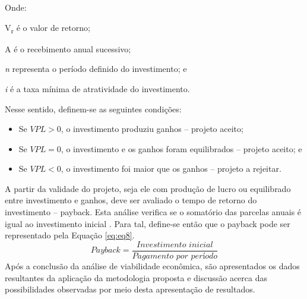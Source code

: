 \noindent Onde:\par
\setlength\parindent{1.5cm} V\textsubscript{r} é o valor de retorno;\par
\setlength\parindent{1.5cm} A é o recebimento anual sucessivo;\par
\setlength\parindent{1.5cm} \textit{n} representa o período definido do investimento; e\par
\setlength\parindent{1.5cm} \textit{i} é a taxa mínima de atratividade do investimento.\par
\noindent Nesse sentido, definem-se as seguintes condições:\par
\begin{itemize}
    \item Se \(VPL>0\), o investimento produziu ganhos – projeto aceito;
    \item Se \(VPL=0\), o investimento e os ganhos foram equilibrados – projeto aceito; e
    \item Se \(VPL<0\), o investimento foi maior que os ganhos – projeto a rejeitar.
\end{itemize}
\noindent A partir da validade do projeto, seja ele com produção de lucro ou equilibrado entre investimento e ganhos, deve ser avaliado o tempo de retorno do investimento – payback. Esta análise verifica se o somatório das parcelas anuais é igual ao investimento inicial \cite{CasarottoFilho2010}. Para tal, define-se então que o payback pode ser representado pela Equação \ref{eq:eq8}.\newline
\begin{equation}\label{eq:eq8}
    \textit{Payback}=\frac{\textit{Investimento inicial}}{\textit{Pagamento por período}}
\end{equation}
\noindent Após a conclusão da análise de viabilidade econômica, são apresentados os dados resultantes da aplicação da metodologia  proposta e discussão acerca das possibilidades observadas por meio desta apresentação de resultados.
